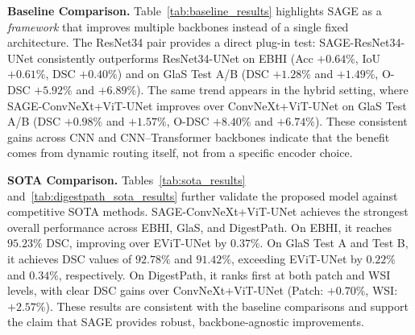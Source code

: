 \noindent\textbf{Baseline Comparison.}
Table~\ref{tab:baseline_results} highlights SAGE as a \emph{framework} that improves multiple backbones instead of a single fixed architecture. The ResNet34 pair provides a direct plug-in test: SAGE-ResNet34-UNet consistently outperforms ResNet34-UNet on EBHI (Acc $+0.64\%$, IoU $+0.61\%$, DSC $+0.40\%$) and on GlaS Test A/B (DSC $+1.28\%$ and $+1.49\%$, O-DSC $+5.92\%$ and $+6.89\%$). The same trend appears in the hybrid setting, where SAGE-ConvNeXt+ViT-UNet improves over ConvNeXt+ViT-UNet on GlaS Test A/B (DSC $+0.98\%$ and $+1.57\%$, O-DSC $+8.40\%$ and $+6.74\%$). These consistent gains across CNN and CNN--Transformer backbones indicate that the benefit comes from dynamic routing itself, not from a specific encoder choice.


\noindent\textbf{SOTA Comparison.} Tables~\ref{tab:sota_results} and~\ref{tab:digestpath_sota_results} further validate the proposed model against competitive SOTA methods. SAGE-ConvNeXt+ViT-UNet achieves the strongest overall performance across EBHI, GlaS, and DigestPath. On EBHI, it reaches $95.23\%$ DSC, improving over EViT-UNet by $0.37\%$. On GlaS Test A and Test B, it achieves DSC values of $92.78\%$ and $91.42\%$, exceeding EViT-UNet by $0.22\%$ and $0.34\%$, respectively. On DigestPath, it ranks first at both patch and WSI levels, with clear DSC gains over ConvNeXt+ViT-UNet (Patch: $+0.70\%$, WSI: $+2.57\%$). These results are consistent with the baseline comparisons and support the claim that SAGE provides robust, backbone-agnostic improvements.

